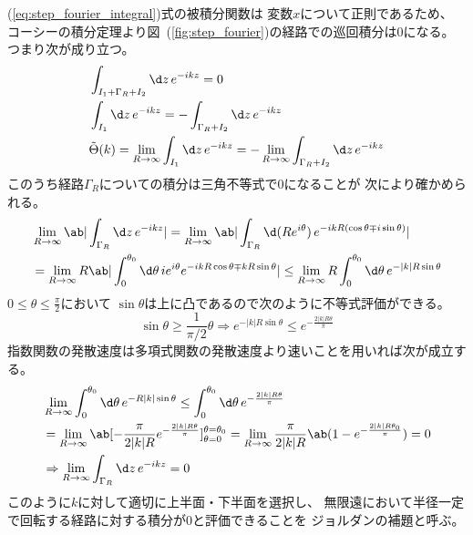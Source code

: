 (\ref{eq:step_fourier_integral})式の被積分関数は
変数$x$について正則であるため、
コーシーの積分定理より図~(\ref{fig:step_fourier})の経路での巡回積分は0になる。
つまり次が成り立つ。
\begin{equation}
  \begin{split}
    &\int_{I_1+\Gamma_R+I_2}\d z\,e^{-ikz}=0 \\
    &\int_{I_1}\d z\,e^{-ikz}
    =-\int_{\Gamma_R+I_2}\d z\,e^{-ikz} \\
    &\tilde{\Theta}(k)
    =\lim_{R\rightarrow\infty}\int_{I_1}\d z\,e^{-ikz}
    =-\lim_{R\rightarrow\infty}\int_{\Gamma_R+I_2}\d z\,e^{-ikz}
  \end{split}
\end{equation}
このうち経路$\Gamma_R$についての積分は三角不等式で0になることが
次により確かめられる。
\begin{equation}
  \begin{split}
    &\lim_{R\rightarrow\infty}\ab|\int_{\Gamma_R}\d z\,e^{-ikz}|
    =\lim_{R\rightarrow\infty}\ab|\int_{\Gamma_R}\d(Re^{i\theta})\,
    e^{-ikR(\cos\theta\mp i\sin\theta)}| \\
    &=\lim_{R\rightarrow\infty}
    R\ab|\int_0^{\theta_0}\d\theta\,
    ie^{i\theta}e^{-ikR\cos\theta\mp kR\sin\theta}|
    \leq\lim_{R\rightarrow\infty}
    R \int_0^{\theta_0}\d\theta\,
    e^{-|k|R\sin\theta}
  \end{split}
\end{equation}
$0\leq\theta\leq\frac{\pi}{2}$において
$\sin\theta$は上に凸であるので次のように不等式評価ができる。
\begin{equation}
  \sin\theta\geq
  \frac{1}{\pi/2}\theta
  \Rightarrow
  e^{-|k|R\sin\theta}
  \leq
  e^{-\frac{2|k|R\theta}{\pi}}
\end{equation}
指数関数の発散速度は多項式関数の発散速度より速いことを用いれば次が成立する。
\begin{equation}
  \begin{split}
    &\lim_{R\rightarrow\infty}
    \int_0^{\theta_0}\d\theta\,
    e^{-R|k|\sin\theta}
    \leq
    \int_0^{\theta_0}\d\theta\,
    e^{-\frac{2|k|R\theta}{\pi}} \\
    &=\lim_{R\rightarrow\infty}\ab[
    -\frac{\pi}{2|k|R}e^{-\frac{2|k|R\theta}{\pi}}
    ]_{\theta=0}^{\theta=\theta_0}
    =\lim_{R\rightarrow\infty}
    \frac{\pi}{2|k|R}\ab(1-e^{-\frac{2|k|R\theta_0}{\pi}})
    =0 \\
    &\Rightarrow
    \lim_{R\rightarrow\infty}\int_{\Gamma_R}\d z\,e^{-ikz}=0
  \end{split}
\end{equation}
このように$k$に対して適切に上半面・下半面を選択し、
無限遠において半径一定で回転する経路に対する積分が0と評価できることを
ジョルダンの補題と呼ぶ。

